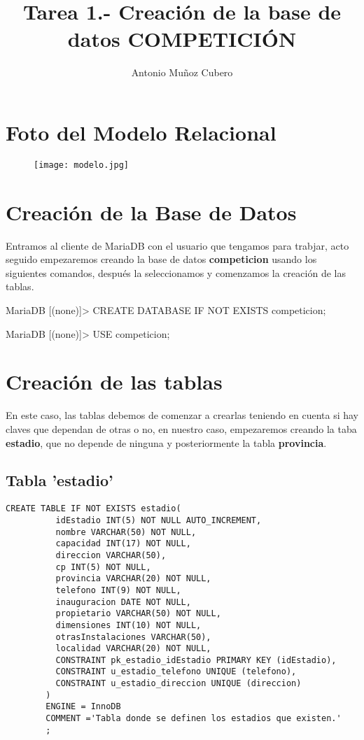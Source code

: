 \documentclass{article}
\title{Tarea 1.- Creación de la base de datos \textbf{COMPETICIÓN}}
\author{Antonio Muñoz Cubero}
\begin{document}
\maketitle
{}
\pagestyle{fancy} 

\newpage
  \tableofcontents

\newpage
  \section{Foto del Modelo Relacional}
    \begin{figure}[h]
      \centering
      \texttt{[image: modelo.jpg]}
    \end{figure}
\newpage
  \section{Creación de la Base de Datos}
    Entramos al cliente de MariaDB con el usuario que tengamos para trabjar, acto seguido empezaremos creando 
    la base de datos \textbf{competicion} usando los siguientes comandos, después la seleccionamos y comenzamos la creación de las tablas. 
    \begin{listing}[style=consola, numbers=none]
    MariaDB [(none)]> CREATE DATABASE IF NOT EXISTS competicion;

    MariaDB [(none)]> USE competicion;

    \end{listing}
  \section{Creación de las tablas}
    En este caso, las tablas debemos de comenzar a crearlas teniendo en cuenta si hay claves que dependan de otras o no, en nuestro caso, empezaremos creando 
    la taba \textbf{estadio}, que no depende de ninguna y posteriormente la tabla \textbf{provincia}.
    \subsection{Tabla 'estadio'}
      \begin{lstlisting}[style=C]
        CREATE TABLE IF NOT EXISTS estadio(
          idEstadio INT(5) NOT NULL AUTO_INCREMENT,
          nombre VARCHAR(50) NOT NULL,
          capacidad INT(17) NOT NULL,
          direccion VARCHAR(50),
          cp INT(5) NOT NULL,
          provincia VARCHAR(20) NOT NULL,
          telefono INT(9) NOT NULL,
          inauguracion DATE NOT NULL,
          propietario VARCHAR(50) NOT NULL,
          dimensiones INT(10) NOT NULL,
          otrasInstalaciones VARCHAR(50),
          localidad VARCHAR(20) NOT NULL,
          CONSTRAINT pk_estadio_idEstadio PRIMARY KEY (idEstadio),
          CONSTRAINT u_estadio_telefono UNIQUE (telefono),
          CONSTRAINT u_estadio_direccion UNIQUE (direccion)
        )
        ENGINE = InnoDB
        COMMENT ='Tabla donde se definen los estadios que existen.'
        ;
      \end{lstlisting}
\newpage
\end{document}
